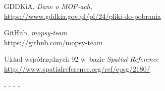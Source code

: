 \begin{thebibliography}{99}
 GDDKiA, \textit{Dane o MOP-ach}, \\ \url{https://www.gddkia.gov.pl/pl/24/pliki-do-pobrania}

 GitHub, \textit{mopsy-team} \\ \url{https://github.com/mopsy-team}

 Układ współrzędnych 92 w~bazie \textit{Spatial Reference} \\ \url{http://www.spatialreference.org/ref/epsg/2180/}
\end{thebibliography}



-%
-%
-%
-%